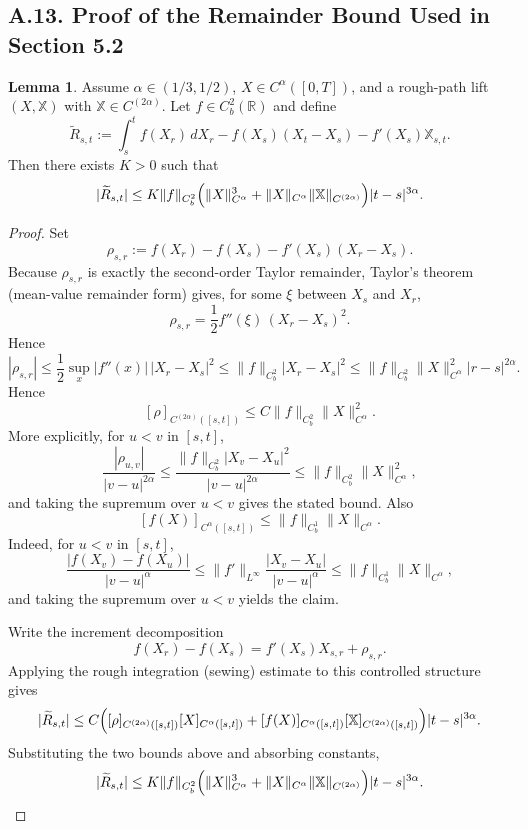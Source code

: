 \documentclass[11pt]{article}
\theoremstyle{definition}
\newtheorem{lemma}{Lemma}
\theoremstyle{remark}
\begin{document}
\subsection*{A.13. Proof of the Remainder Bound Used in Section 5.2}
\begin{lemma}
Assume $\alpha\in(1/3,1/2)$, $X\in C^\alpha([0,T])$, and a rough-path lift $(X,\mathbb X)$ with $\mathbb X\in C^{(2\alpha)}$. Let $f\in C_b^2(\mathbb R)$ and define
\[
\widetilde R_{s,t}
:=
\int_s^t f(X_r)\,dX_r
-f(X_s)(X_t-X_s)
-f'(X_s)\mathbb X_{s,t}.
\]
Then there exists $K>0$ such that
\[
|\widetilde R_{s,t}|
\le
K\|f\|_{C_b^2}
\Bigl(
\|X\|_{C^\alpha}^3
+\|X\|_{C^\alpha}\|\mathbb X\|_{C^{(2\alpha)}}
\Bigr)|t-s|^{3\alpha}.
\]
\end{lemma}
\begin{proof}
Set
\[
\rho_{s,r}:=f(X_r)-f(X_s)-f'(X_s)(X_r-X_s).
\]
Because $\rho_{s,r}$ is exactly the second-order Taylor remainder, Taylor's theorem (mean-value remainder form) gives, for some $\xi$ between $X_s$ and $X_r$,
\[
\rho_{s,r}
=
\frac12 f''(\xi)\,(X_r-X_s)^2.
\]
Hence
\[
|\rho_{s,r}|
\le
\frac12\sup_x |f''(x)|\,|X_r-X_s|^2
\le
\|f\|_{C_b^2}|X_r-X_s|^2
\le
\|f\|_{C_b^2}\|X\|_{C^\alpha}^2|r-s|^{2\alpha}.
\]
Hence
\[
[\rho]_{C^{(2\alpha)}([s,t])}
\le
C\|f\|_{C_b^2}\|X\|_{C^\alpha}^2.
\]
More explicitly, for $u<v$ in $[s,t]$,
\[
\frac{|\rho_{u,v}|}{|v-u|^{2\alpha}}
\le
\frac{\|f\|_{C_b^2}|X_v-X_u|^2}{|v-u|^{2\alpha}}
\le
\|f\|_{C_b^2}\|X\|_{C^\alpha}^2,
\]
and taking the supremum over $u<v$ gives the stated bound.
Also
\[
[f(X)]_{C^\alpha([s,t])}
\le
\|f\|_{C_b^1}\|X\|_{C^\alpha}.
\]
Indeed, for $u<v$ in $[s,t]$,
\[
\frac{|f(X_v)-f(X_u)|}{|v-u|^\alpha}
\le
\|f'\|_{L^\infty}\frac{|X_v-X_u|}{|v-u|^\alpha}
\le
\|f\|_{C_b^1}\|X\|_{C^\alpha},
\]
and taking the supremum over $u<v$ yields the claim.

Write the increment decomposition
\[
f(X_r)-f(X_s)=f'(X_s)X_{s,r}+\rho_{s,r}.
\]
Applying the rough integration (sewing) estimate to this controlled structure gives
\[
|\widetilde R_{s,t}|
\le
C\Bigl(
[\rho]_{C^{(2\alpha)}([s,t])}[X]_{C^\alpha([s,t])}
+[f(X)]_{C^\alpha([s,t])}[\mathbb X]_{C^{(2\alpha)}([s,t])}
\Bigr)|t-s|^{3\alpha}.
\]
Substituting the two bounds above and absorbing constants,
\[
|\widetilde R_{s,t}|
\le
K\|f\|_{C_b^2}
\Bigl(
\|X\|_{C^\alpha}^3
+\|X\|_{C^\alpha}\|\mathbb X\|_{C^{(2\alpha)}}
\Bigr)|t-s|^{3\alpha}.
\]
\end{proof}
\end{document}
